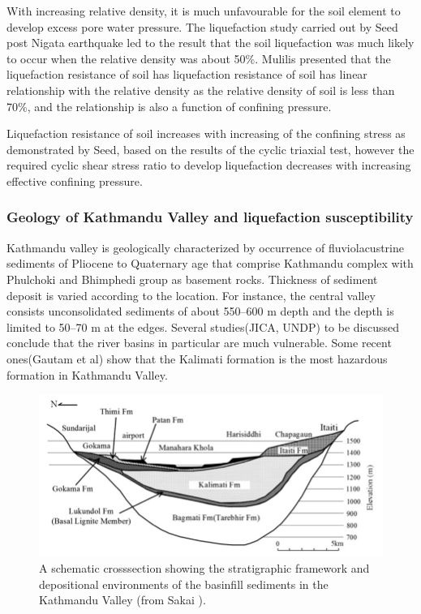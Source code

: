 With increasing relative density, it is much unfavourable for the soil element to develop excess pore water pressure. The liquefaction study carried out by Seed post Nigata earthquake led to the result that the soil liquefaction was much likely to occur when the relative density was about 50\%. Mulilis presented that the liquefaction resistance of soil has liquefaction resistance of soil has linear relationship with the relative density as the relative density of soil is less than 70\%, and the relationship is also a function of confining pressure.\cite{r15}

Liquefaction resistance of soil increases with increasing of the confining stress as demonstrated by Seed, based on the results of the cyclic triaxial test, however the required cyclic shear stress ratio to develop liquefaction decreases with increasing effective confining pressure.\cite{r16}

\subsubsection{Geology of Kathmandu Valley and liquefaction susceptibility}
Kathmandu valley is geologically characterized by occurrence of fluvio\-lacustrine sediments of Pliocene to Quaternary age that comprise Kathmandu complex with Phulchoki and Bhimphedi group as basement rocks. Thickness of sediment deposit is varied according to the location. For instance, the central valley consists unconsolidated sediments of about 550–600 m depth and the depth is limited to 50–70 m at the edges. Several studies(JICA, UNDP) to be discussed conclude that the river basins in particular are much vulnerable. Some recent ones(Gautam et al) show that the Kalimati formation is the most hazardous formation in Kathmandu Valley.

\begin{figure}[!hbt]
\centering
\includegraphics[width=0.75\linewidth,keepaspectratio]{images/main/geological_cross_section.png}
\caption{A schematic cross\-section showing the stratigraphic framework and depositional environments of the basin\-fill sediments in the Kathmandu Valley (from Sakai \cite{r24}).}
\end{figure}

